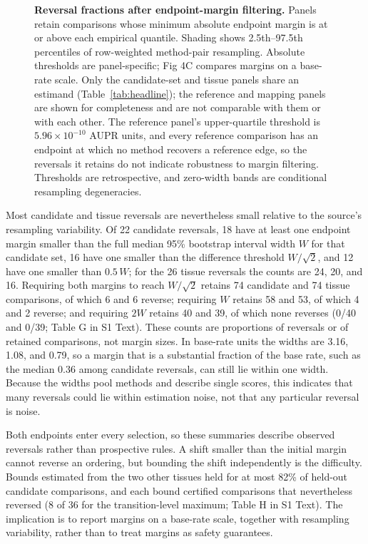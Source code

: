 \documentclass[10pt,letterpaper]{article}
\begin{document}
\begin{figure}[!ht]
\caption{{\bf Reversal fractions after endpoint-margin filtering.} Panels retain comparisons whose minimum absolute endpoint margin is at or above each empirical quantile. Shading shows 2.5th--97.5th percentiles of row-weighted method-pair resampling. Absolute thresholds are panel-specific; Fig 4C compares margins on a base-rate scale. Only the candidate-set and tissue panels share an estimand (Table~\ref{tab:headline}); the reference and mapping panels are shown for completeness and are not comparable with them or with each other. The reference panel's upper-quartile threshold is $5.96\times10^{-10}$ AUPR units, and every reference comparison has an endpoint at which no method recovers a reference edge, so the reversals it retains do not indicate robustness to margin filtering. Thresholds are retrospective, and zero-width bands are conditional resampling degeneracies.}
\label{fig:margin}
\end{figure}

Most candidate and tissue reversals are nevertheless small relative to the source's resampling variability. Of 22 candidate reversals, 18 have at least one endpoint margin smaller than the full median 95\% bootstrap interval width $W$ for that candidate set, 16 have one smaller than the difference threshold $W/\sqrt2$, and 12 have one smaller than $0.5\,W$; for the 26 tissue reversals the counts are 24, 20, and 16. Requiring both margins to reach $W/\sqrt2$ retains 74 candidate and 74 tissue comparisons, of which 6 and 6 reverse; requiring $W$ retains 58 and 53, of which 4 and 2 reverse; and requiring $2W$ retains 40 and 39, of which none reverses (0/40 and 0/39; Table G in S1 Text). These counts are proportions of reversals or of retained comparisons, not margin sizes. In base-rate units the widths are 3.16, 1.08, and 0.79, so a margin that is a substantial fraction of the base rate, such as the median 0.36 among candidate reversals, can still lie within one width. Because the widths pool methods and describe single scores, this indicates that many reversals could lie within estimation noise, not that any particular reversal is noise.

Both endpoints enter every selection, so these summaries describe observed reversals rather than prospective rules. A shift smaller than the initial margin cannot reverse an ordering, but bounding the shift independently is the difficulty. Bounds estimated from the two other tissues held for at most 82\% of held-out candidate comparisons, and each bound certified comparisons that nevertheless reversed (8 of 36 for the transition-level maximum; Table H in S1 Text). The implication is to report margins on a base-rate scale, together with resampling variability, rather than to treat margins as safety guarantees.
\end{document}
